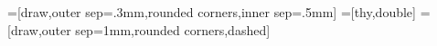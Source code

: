 %
%

\def\outerthysep{.3mm}
\def\innerthysep{.5mm}
=[draw,outer sep=\outerthysep,rounded corners,inner sep=\innerthysep]
=[thy,double]
=[draw,outer sep=1mm,rounded corners,dashed]

\usetikzlibrary{arrows}
\newcommand{\@mmtarrowtip}{angle 45}
\newcommand{\@mmtreversearrowtip}{angle 45 reversed}
\newcommand{\@mmtarrowtipepi}{triangle 45}
\newcommand{\@mmtarrowtipmonoright}{right hook}
\newcommand{\@mmtarrowtipmonoleft}{left hook}
\newcommand{\@mmtarrowtippartial}{right to}
\newcommand{\@mmtarrowtippartialleft}{left to}
\newcommand{\@mmtreversearrowtippartial}{right to reversed}
\newcommand{\@mmtreversearrowtippartialleft}{left to reversed}

